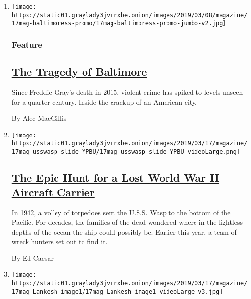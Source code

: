 \begin{enumerate}
\def\labelenumi{\arabic{enumi}.}
\item
  \texttt{[image: https://static01.graylady3jvrrxbe.onion/images/2019/03/08/magazine/17mag-baltimoress-promo/17mag-baltimoress-promo-jumbo-v2.jpg]}

  \hypertarget{feature}{%
  \subsubsection{Feature}\label{feature}}

  \hypertarget{the-tragedy-of-baltimore}{%
  \subsection{\texorpdfstring{\href{/2019/03/12/magazine/baltimore-tragedy-crime.html}{The
  Tragedy of
  Baltimore}}{The Tragedy of Baltimore}}\label{the-tragedy-of-baltimore}}

  Since Freddie Gray's death in 2015, violent crime has spiked to levels
  unseen for a quarter century. Inside the crackup of an American city.

  By Alec MacGillis
\item
  \texttt{[image: https://static01.graylady3jvrrxbe.onion/images/2019/03/17/magazine/17mag-usswasp-slide-YPBU/17mag-usswasp-slide-YPBU-videoLarge.png]}

  \hypertarget{the-epic-hunt-for-a-lost-world-war-ii-aircraft-carrier}{%
  \subsection{\texorpdfstring{\href{/2019/03/13/magazine/uss-wasp-lost-world-war-ii-aircraft-carrier.html}{The
  Epic Hunt for a Lost World War II Aircraft
  Carrier}}{The Epic Hunt for a Lost World War II Aircraft Carrier}}\label{the-epic-hunt-for-a-lost-world-war-ii-aircraft-carrier}}

  In 1942, a volley of torpedoes sent the U.S.S. Wasp to the bottom of
  the Pacific. For decades, the families of the dead wondered where in
  the lightless depths of the ocean the ship could possibly be. Earlier
  this year, a team of wreck hunters set out to find it.

  By Ed Caesar
\item
  \texttt{[image: https://static01.graylady3jvrrxbe.onion/images/2019/03/17/magazine/17mag-Lankesh-image1/17mag-Lankesh-image1-videoLarge-v3.jpg]}

  \hypertarget{feature-1}{%
}
\end{enumerate}
